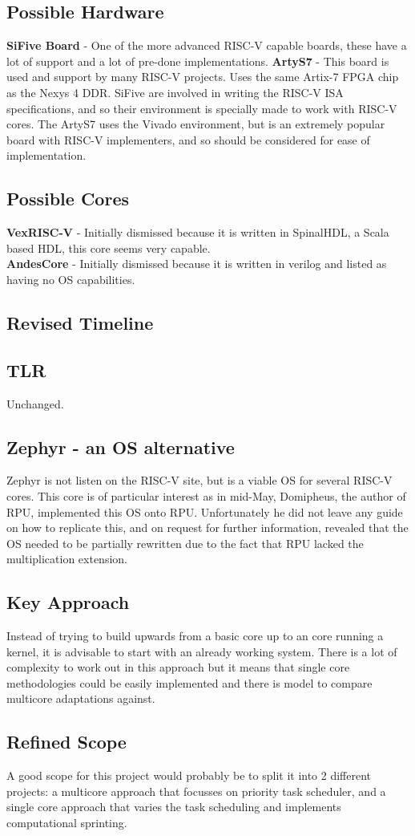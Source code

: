 	\subsection{Possible Hardware}
	\textbf{SiFive Board} - One of the more advanced RISC-V capable boards, these have a lot of support and a lot of pre-done implementations.
	\textbf{ArtyS7} - This board is used and support by many RISC-V projects. Uses the same Artix-7 FPGA chip as the Nexys 4 DDR.
	SiFive are involved in writing the RISC-V ISA specifications, and so their environment is specially made to work with RISC-V cores. The ArtyS7 uses the Vivado environment, but is an extremely popular board with RISC-V implementers, and so should be considered for ease of implementation.
	
	\subsection{Possible Cores}
	\textbf{VexRISC-V} - Initially dismissed because it is written in SpinalHDL, a Scala based HDL, this core seems very capable.\\
	\textbf{AndesCore} - Initially dismissed because it is written in verilog and listed as having no OS capabilities.
	
	\subsection{Revised Timeline}
	
	\subsection{TLR}
	Unchanged.
	
	\subsection{Zephyr - an OS alternative}
	Zephyr is not listen on the RISC-V site, but is a viable OS for several RISC-V cores. This core is of particular interest as in mid-May, Domipheus, the author of RPU, implemented this OS onto RPU. Unfortunately he did not leave any guide on how to replicate this, and on request for further information, revealed that the OS needed to be partially rewritten due to the fact that RPU lacked the multiplication extension. 
	
	\subsection{Key Approach}
	Instead of trying to build upwards from a basic core up to an core running a kernel, it is advisable to start with an already working system. There is a lot of complexity to work out in this approach but it means that single core methodologies could be easily implemented and there is model to compare multicore adaptations against.
	
	\subsection{Refined Scope}
	A good scope for this project would probably be to split it into 2 different projects: a multicore approach that focusses on priority task scheduler, and a single core approach that varies the task scheduling and implements computational sprinting. 
		